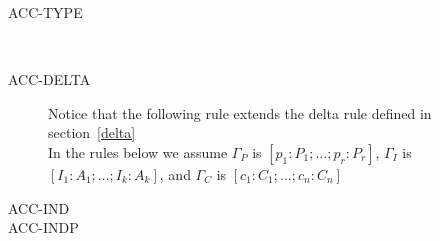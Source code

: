 \begin{description}
\item[ACC-TYPE]
\\
\item[ACC-DELTA]
Notice that the following rule extends the delta rule defined in
section~\ref{delta}
\\
In the rules below we assume $\Gamma_P$ is $[p_1:P_1;\ldots;p_r:P_r]$,
  $\Gamma_I$ is $[I_1:A_1;\ldots;I_k:A_k]$, and $\Gamma_C$ is
  $[c_1:C_1;\ldots;c_n:C_n]$
\item[ACC-IND]
\item[ACC-INDP]

\end{description}





